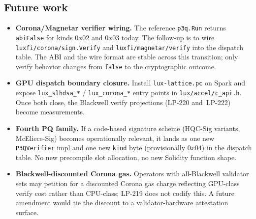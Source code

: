 \subsection{Future work}

\begin{itemize}[leftmargin=2em,nosep]
\item \textbf{Corona/Magnetar verifier wiring.} The reference
  \texttt{p3q.Run} returns \texttt{abiFalse} for kinds $0x02$
  and $0x03$ today. The follow-up is to wire
  \texttt{luxfi/corona/sign.Verify} and
  \texttt{luxfi/magnetar/verify} into the dispatch table. The
  ABI and the wire format are stable across this transition;
  only verify behavior changes from \texttt{false} to the
  cryptographic outcome.
\item \textbf{GPU dispatch boundary closure.} Install
  \texttt{lux-lattice.pc} on Spark and expose
  \texttt{lux\_slhdsa\_*} / \texttt{lux\_corona\_*} entry
  points in \texttt{lux/accel/c\_api.h}. Once both close, the
  Blackwell verify projections (LP-220
  and~LP-222) become measurements.
\item \textbf{Fourth PQ family.} If a code-based signature
  scheme (HQC-Sig variants, McEliece-Sig) becomes
  operationally relevant, it lands as one new
  \texttt{P3QVerifier} impl and one new \texttt{kind} byte
  (provisionally $0x04$) in the dispatch table. No new
  precompile slot allocation, no new Solidity function shape.
\item \textbf{Blackwell-discounted Corona gas.} Operators with
  all-Blackwell validator sets may petition for a discounted
  Corona gas charge reflecting GPU-class verify cost rather
  than CPU-class; LP-219 does not codify this. A future
  amendment would tie the discount to a validator-hardware
  attestation surface.
\end{itemize}

